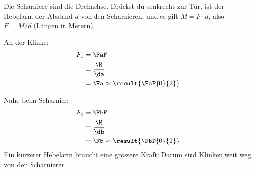 Die Scharniere sind die Drehachse. Drückst du senkrecht zur Tür, ist der Hebelarm der Abstand $d$ von den Scharnieren, und es gilt $M = F\cdot d$, also $F = M/d$ (Längen in Metern).

\begin{abcliste}
\abc
An der Klinke:
\begin{align}
 F_1 &= \FaF \\
   &= \frac{\M}{\da} \\
   &= \Fa \approx \result{\FaP{0}{2}}
\end{align}

\abc
Nahe beim Scharnier:
\begin{align}
 F_2 &= \FbF \\
   &= \frac{\M}{\db} \\
   &= \Fb \approx \result{\FbP{0}{2}}
\end{align}
Ein kürzerer Hebelarm braucht eine grössere Kraft: Darum sind Klinken weit weg von den Scharnieren.
\end{abcliste}
